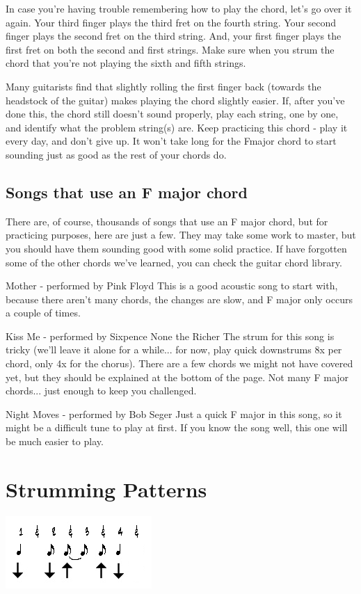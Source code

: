 In case you're having trouble remembering how to play the chord, let's go over it again. Your third finger plays the third fret on the fourth string. Your second finger plays the second fret on the third string. And, your first finger plays the first fret on both the second and first strings. Make sure when you strum the chord that you're not playing the sixth and fifth strings.

Many guitarists find that slightly rolling the first finger back (towards the headstock of the guitar) makes playing the chord slightly easier. If, after you've done this, the chord still doesn't sound properly, play each string, one by one, and identify what the problem string(s) are. Keep practicing this chord - play it every day, and don't give up. It won't take long for the Fmajor chord to start sounding just as good as the rest of your chords do.

\subsection{Songs that use an F major chord}

There are, of course, thousands of songs that use an F major chord, but for practicing purposes, here are just a few. They may take some work to master, but you should have them sounding good with some solid practice. If have forgotten some of the other chords we've learned, you can check the guitar chord library.

Mother - performed by Pink Floyd
This is a good acoustic song to start with, because there aren't many chords, the changes are slow, and F major only occurs a couple of times.

Kiss Me - performed by Sixpence None the Richer
The strum for this song is tricky (we'll leave it alone for a while... for now, play quick downstrums 8x per chord, only 4x for the chorus). There are a few chords we might not have covered yet, but they should be explained at the bottom of the page. Not many F major chords... just enough to keep you challenged.

Night Moves - performed by Bob Seger
Just a quick F major in this song, so it might be a difficult tune to play at first. If you know the song well, this one will be much easier to play. 

\section{Strumming Patterns}
\includegraphics{partfour/strum4.png}

